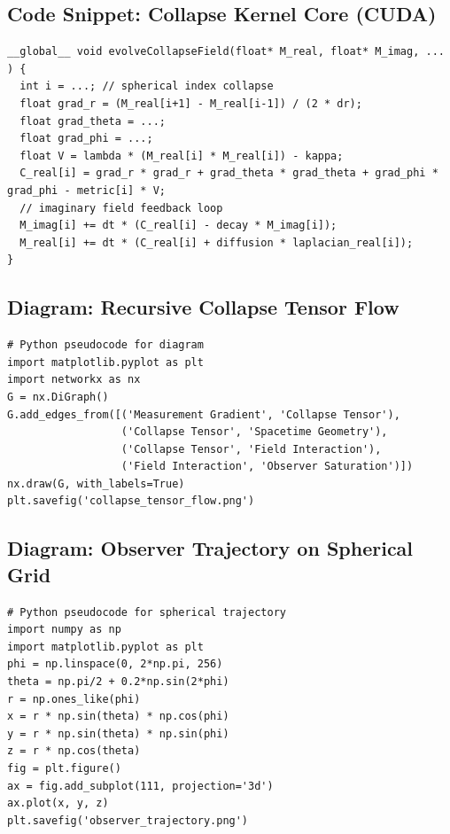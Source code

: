 \subsection*{Code Snippet: Collapse Kernel Core (CUDA)}
\begin{verbatim}
__global__ void evolveCollapseField(float* M_real, float* M_imag, ... ) {
  int i = ...; // spherical index collapse
  float grad_r = (M_real[i+1] - M_real[i-1]) / (2 * dr);
  float grad_theta = ...;
  float grad_phi = ...;
  float V = lambda * (M_real[i] * M_real[i]) - kappa;
  C_real[i] = grad_r * grad_r + grad_theta * grad_theta + grad_phi * grad_phi - metric[i] * V;
  // imaginary field feedback loop
  M_imag[i] += dt * (C_real[i] - decay * M_imag[i]);
  M_real[i] += dt * (C_real[i] + diffusion * laplacian_real[i]);
}
\end{verbatim}

\subsection*{Diagram: Recursive Collapse Tensor Flow}
\begin{center}

\end{center}
\begin{verbatim}
# Python pseudocode for diagram
import matplotlib.pyplot as plt
import networkx as nx
G = nx.DiGraph()
G.add_edges_from([('Measurement Gradient', 'Collapse Tensor'),
                  ('Collapse Tensor', 'Spacetime Geometry'),
                  ('Collapse Tensor', 'Field Interaction'),
                  ('Field Interaction', 'Observer Saturation')])
nx.draw(G, with_labels=True)
plt.savefig('collapse_tensor_flow.png')
\end{verbatim}

\subsection*{Diagram: Observer Trajectory on Spherical Grid}
\begin{center}

\end{center}
\begin{verbatim}
# Python pseudocode for spherical trajectory
import numpy as np
import matplotlib.pyplot as plt
phi = np.linspace(0, 2*np.pi, 256)
theta = np.pi/2 + 0.2*np.sin(2*phi)
r = np.ones_like(phi)
x = r * np.sin(theta) * np.cos(phi)
y = r * np.sin(theta) * np.sin(phi)
z = r * np.cos(theta)
fig = plt.figure()
ax = fig.add_subplot(111, projection='3d')
ax.plot(x, y, z)
plt.savefig('observer_trajectory.png')
\end{verbatim}

